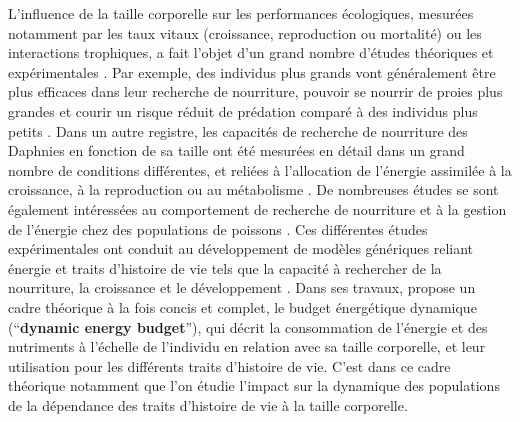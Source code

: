 L'influence de la taille corporelle sur les performances écologiques, mesurées
notamment par les taux vitaux (croissance, reproduction ou mortalité) ou les
interactions trophiques, a fait l'objet d'un grand nombre d'études théoriques
et expérimentales
\autocites{peters1986a,calder1996a,de-roos2001a,claessen2004a}. Par
exemple, des individus plus grands vont généralement être plus efficaces dans
leur recherche de nourriture, pouvoir se nourrir de proies plus grandes et
courir un risque réduit de prédation comparé à des individus plus petits
\autocites{paradis1996a}.
Dans un autre registre, les capacités de recherche de nourriture des Daphnies
en fonction de sa taille ont été mesurées en détail dans un grand nombre de
conditions différentes, et reliées à l'allocation de l'énergie assimilée à la
croissance, à la reproduction ou au métabolisme \autocites[par ex.
][]{lampert1978a,gurney1990a,mccauley1990a,kooijman2000a}. De nombreuses études
se sont également intéressées au comportement de recherche de nourriture et à la
gestion de l'énergie chez des populations de poissons \autocites[par ex.
][]{elliott1975a,mittelbach1981a,fuiman1994a,hjelm2001a}. Ces différentes études
expérimentales ont conduit au développement de modèles génériques reliant
énergie et traits d'histoire de vie tels que la capacité à rechercher de la
nourriture, la croissance et le développement
\autocites{kooijman2000a, nisbet2000a, west2001a}. Dans ses travaux,
\textcite{kooijman2000a} propose un cadre théorique à la fois concis et complet,
le budget énergétique dynamique (``\textbf{dynamic energy budget}''), qui décrit
la consommation  de l'énergie et des nutriments à l'échelle de l'individu en
relation avec sa taille corporelle, et leur utilisation pour les différents
traits d'histoire de vie. C'est dans ce cadre théorique notamment que l'on
étudie l'impact sur la dynamique des populations de la dépendance des traits
d'histoire de vie à la taille corporelle.

